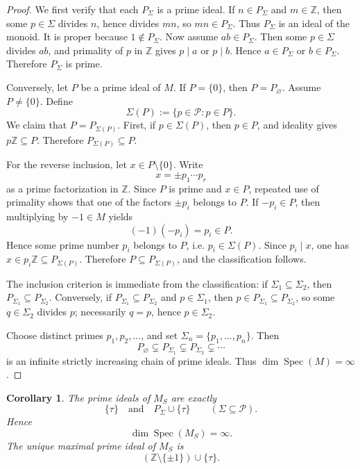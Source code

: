 \documentclass[11pt]{article}
\newtheorem{corollary}[theorem]{Corollary}
\theoremstyle{definition}
\newcommand{\Z}{\mathbb Z}
\newcommand{\Spec}{\operatorname{Spec}}
\newcommand{\taup}{\tau}
\begin{document}
\begin{proof}
We first verify that each \(P_\Sigma\) is a prime ideal.  If \(n\in P_\Sigma\) and \(m\in\Z\), then some \(p\in\Sigma\) divides \(n\), hence divides \(mn\), so \(mn\in P_\Sigma\).  Thus \(P_\Sigma\) is an ideal of the monoid.  It is proper because \(1\notin P_\Sigma\).  Now assume \(ab\in P_\Sigma\).  Then some \(p\in\Sigma\) divides \(ab\), and primality of \(p\) in \(\Z\) gives \(p\mid a\) or \(p\mid b\).  Hence \(a\in P_\Sigma\) or \(b\in P_\Sigma\).  Therefore \(P_\Sigma\) is prime.

Conversely, let \(P\) be a prime ideal of \(M\).  If \(P=\{0\}\), then \(P=P_{\varnothing}\).  Assume \(P\neq\{0\}\).  Define
\[
\Sigma(P):=\{p\in\mathcal P:p\in P\}.
\]
We claim that \(P=P_{\Sigma(P)}\).  First, if \(p\in\Sigma(P)\), then \(p\in P\), and ideality gives \(p\Z\subseteq P\).  Therefore \(P_{\Sigma(P)}\subseteq P\).

For the reverse inclusion, let \(x\in P\setminus\{0\}\).  Write
\[
x=\pm p_1\cdots p_r
\]
as a prime factorization in \(\Z\).  Since \(P\) is prime and \(x\in P\), repeated use of primality shows that one of the factors \(\pm p_i\) belongs to \(P\).  If \(-p_i\in P\), then multiplying by \(-1\in M\) yields
\[
(-1)(-p_i)=p_i\in P.
\]
Hence some prime number \(p_i\) belongs to \(P\), i.e. \(p_i\in\Sigma(P)\).  Since \(p_i\mid x\), one has \(x\in p_i\Z\subseteq P_{\Sigma(P)}\).  Therefore \(P\subseteq P_{\Sigma(P)}\), and the classification follows.

The inclusion criterion is immediate from the classification: if \(\Sigma_1\subseteq\Sigma_2\), then \(P_{\Sigma_1}\subseteq P_{\Sigma_2}\).  Conversely, if \(P_{\Sigma_1}\subseteq P_{\Sigma_2}\) and \(p\in\Sigma_1\), then \(p\in P_{\Sigma_1}\subseteq P_{\Sigma_2}\), so some \(q\in\Sigma_2\) divides \(p\); necessarily \(q=p\), hence \(p\in\Sigma_2\).

Choose distinct primes \(p_1,p_2,\dots\), and set \(\Sigma_n=\{p_1,\dots,p_n\}\).  Then
\[
P_{\varnothing}\subsetneq P_{\Sigma_1}\subsetneq P_{\Sigma_2}\subsetneq\cdots
\]
is an infinite strictly increasing chain of prime ideals.  Thus \(\dim\Spec(M)=\infty\).
\end{proof}

\begin{corollary}\label{cor:monoid-spec-ms}
The prime ideals of \(M_S\) are exactly
\[
\{\taup\}
\quad\text{and}\quad
P_\Sigma\cup\{\taup\}\qquad (\Sigma\subseteq \mathcal P).
\]
Hence
\[
\dim\Spec(M_S)=\infty.
\]
The unique maximal prime ideal of \(M_S\) is
\[
(\Z\setminus\{\pm1\})\cup\{\taup\}.
\]
\end{corollary}
\end{document}
